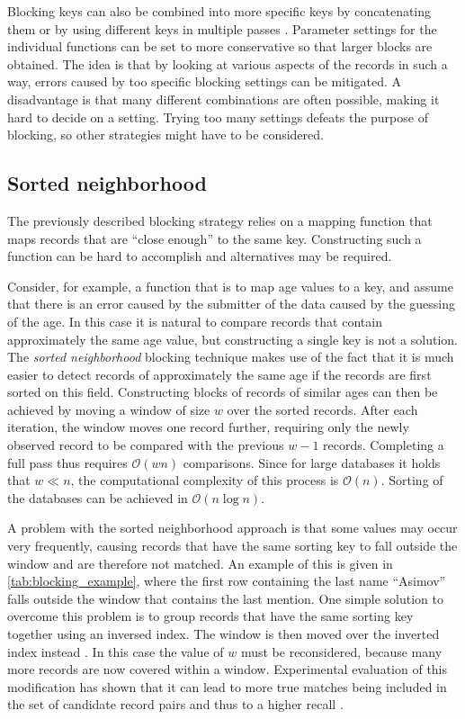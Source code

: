 Blocking keys can also be combined into more specific keys by concatenating them \citep{Christen2012} or by using different keys in multiple passes \citep{Baxter2003}.
Parameter settings for the individual functions can be set to more conservative so that larger blocks are obtained.
The idea is that by looking at various aspects of the records in such a way, errors caused by too specific blocking settings can be mitigated.
A disadvantage is that many different combinations are often possible, making it hard to decide on a setting.
Trying too many settings defeats the purpose of blocking, so other strategies might have to be considered.




\subsection{Sorted neighborhood}
\label{sec:sorted_neighborhood}

The previously described blocking strategy relies on a mapping function that maps records that are ``close enough'' to the same key.
Constructing such a function can be hard to accomplish and alternatives may be required.

Consider, for example, a function that is to map age values to a key, and assume that there is an error caused by the submitter of the data caused by the guessing of the age.
In this case it is natural to compare records that contain approximately the same age value, but constructing a single key is not a solution.
The \emph{sorted neighborhood} blocking technique \citep{Hernandez1995} makes use of the fact that it is much easier to detect records of approximately the same age if the records are first sorted on this field.
Constructing blocks of records of similar ages can then be achieved by moving a window of size $w$ over the sorted records.
After each iteration, the window moves one record further, requiring only the newly observed record to be compared with the previous $w-1$ records.
Completing a full pass thus requires $\mathcal{O}(wn)$ comparisons.
Since for large databases it holds that $w \ll n$, the computational complexity of this process is $\mathcal{O}(n)$.
Sorting of the databases can be achieved in $\mathcal{O}(n \log n)$.

A problem with the sorted neighborhood approach is that some values may occur very frequently, causing records that have the same sorting key to fall outside the window and are therefore not matched.
An example of this is given in \cref{tab:blocking_example}, where the first row containing the last name ``Asimov'' falls outside the window that contains the last mention.
One simple solution to overcome this problem is to group records that have the same sorting key together using an inversed index.
The window is then moved over the inverted index instead \citep{Christen2012}.
In this case the value of $w$ must be reconsidered, because many more records are now covered within a window.
Experimental evaluation of this modification has shown that it can lead to more true matches being included in the set of candidate record pairs and thus to a higher recall \citep{Christen2012}.

